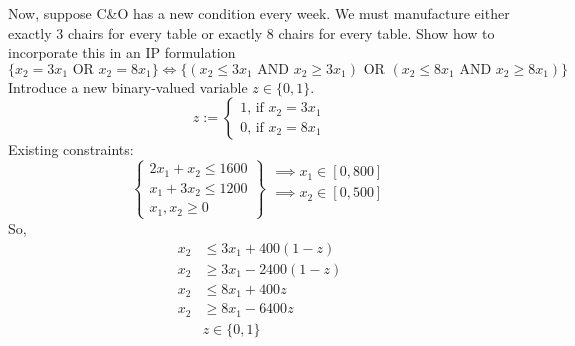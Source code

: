 Now, suppose C\&O has a new condition every week. We must manufacture either
exactly 3 chairs for every table or exactly 8 chairs for every table. Show
how to incorporate this in an IP formulation
\[
    \{x_2=3x_1 \text{ OR } x_2=8x_1\}
    \iff
    \{(x_2\le 3x_1 \text{ AND } x_2\ge3x_1) \text{ OR }
    (x_2\le 8x_1 \text{ AND } x_2\ge8x_1)\}
\]
Introduce a new binary-valued variable $z\in\{0,1\}$.
\[
    z:=
    \begin{cases}
        1 \text{, if } x_2=3x_1\\
        0 \text{, if } x_2=8x_1
    \end{cases}
\]
Existing constraints:
\[
    \left\{\begin{array}{r}
    2x_1 + x_2 \le 1600\\
    x_1 + 3x_2 \le 1200\\
    x_1, x_2 \ge 0
    \end{array}\right\}
    \begin{array}{r}
        \implies x_1\in[0,800]\\
        \implies x_2\in[0,500]\\
        \\
    \end{array}
\]
So,
\begin{align*}
    x_2&\le 3x_1+400(1-z)\\
    x_2&\ge 3x_1-2400(1-z)\\
    x_2&\le 8x_1+400z\\
    x_2&\ge 8x_1-6400z\\
    &z\in\{0,1\}
\end{align*}